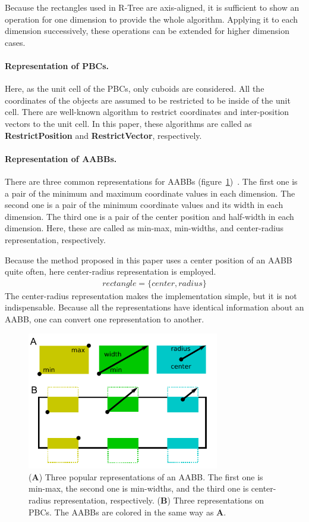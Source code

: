 \documentclass[10pt,letterpaper,twocolumn]{article}
\begin{document}
Because the rectangles used in R-Tree are axis-aligned, it is sufficient to show
an operation for one dimension to provide the whole algorithm. Applying it to
each dimension successively, these operations can be extended for higher
dimension cases.

\paragraph{Representation of PBCs.}
Here, as the unit cell of the PBCs, only cuboids are considered.
All the coordinates of the objects are assumed to be restricted to be inside of
the unit cell.
There are well-known algorithm to restrict coordinates and inter-position
vectors to the unit cell.
In this paper, these algorithms are called as \textbf{RestrictPosition} and
\textbf{RestrictVector}, respectively.

\paragraph{Representation of AABBs.}
There are three common representations for AABBs
(figure~\ref{fig-rectangle-rep})~\cite{real-time-collision-detection}.
The first one is a pair of the minimum and maximum coordinate values
in each dimension.
The second one is a pair of the minimum coordinate values and its width in each
dimension.
The third one is a pair of the center position and half-width in each dimension.
Here, these are called as min-max, min-widths, and center-radius representation,
respectively.

Because the method proposed in this paper uses a center position of an AABB
quite often, here center-radius representation is employed.
\begin{eqnarray}
    rectangle = \{center, radius\} \nonumber
\end{eqnarray}
The center-radius representation makes the implementation simple, but it is not indispensable.
Because all the representations have identical information about an AABB,
one can convert one representation to another.

\begin{figure}[thb]
    \includegraphics[width=8.4cm, bb=2 6 226 165]{fig-rect-rep.eps}
    \caption{
    (\textbf{A})
    Three popular representations of an AABB. The first one is min-max,
    the second one is min-widths, and the third one is center-radius representation,
    respectively.
    (\textbf{B})
    Three representations on PBCs.
    The AABBs are colored in the same way as \textbf{A}.
    }
    \label{fig-rectangle-rep}
\end{figure}
\end{document}
